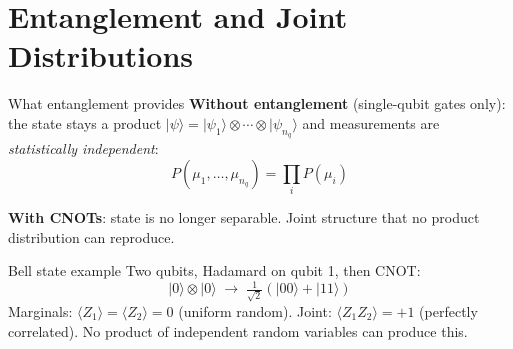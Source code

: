 
\section{Entanglement and Joint Distributions}
\label{sec:entanglement}
\frame[plain]{\sectionpage}

\begin{frame}{What entanglement provides}
    \textbf{Without entanglement} (single-qubit gates only): the
    state stays a product
    $|\psi\rangle = |\psi_1\rangle\otimes\cdots\otimes
    |\psi_{n_q}\rangle$ and measurements are
    \emph{statistically independent}:
    \[
    P(\mu_1,\ldots,\mu_{n_q}) = \prod_i P(\mu_i)
    \]
    \medskip

    \textbf{With CNOTs}: state is no longer separable. Joint
    structure that no product distribution can reproduce.
    \medskip

    \begin{block}{Bell state example}
        Two qubits, Hadamard on qubit 1, then CNOT:
        \[
        |0\rangle\otimes|0\rangle \;\longrightarrow\;
        \tfrac{1}{\sqrt 2}(|00\rangle+|11\rangle)
        \]
        Marginals: $\langle Z_1\rangle = \langle Z_2\rangle = 0$
        (uniform random).
        Joint: $\langle Z_1 Z_2\rangle = +1$ (perfectly
        correlated). No product of independent random variables
        can produce this.
    \end{block}
\end{frame}

